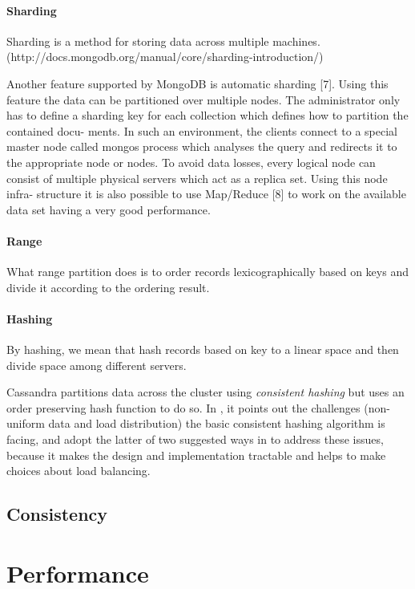 \documentclass[12pt,letter]{article}
\begin{document}
\paragraph*{Sharding}
Sharding is a method for storing data across multiple machines. (http://docs.mongodb.org/manual/core/sharding-introduction/)

Another feature supported by MongoDB is automatic sharding [7]. Using this feature the data can be partitioned over multiple nodes. The administrator only has to define a sharding key for each collection which defines how to partition the contained docu- ments. In such an environment, the clients connect to a special master node called mongos process which analyses the query and redirects it to the appropriate node or nodes. To avoid data losses, every logical node can consist of multiple physical servers which act as a replica set. Using this node infra- structure it is also possible to use Map/Reduce [8] to work on the available data set having a very good performance.

\paragraph*{Range}
What range partition does is to order records lexicographically based on keys and divide it according to the ordering result.

\paragraph*{Hashing}
By hashing, we mean that hash records based on key to a linear space and then divide space among different servers.

Cassandra partitions data across the cluster using \textit{consistent hashing} but uses an order preserving hash function to do so. In \citep{LakshamAvinash2010}, it points out the challenges (non-uniform data and load distribution) the basic consistent hashing algorithm\citep{Karger1997} is facing, and adopt the latter of two suggested ways in \citep{Stoica2003} to address these issues, because it makes the design and implementation tractable and helps to make choices about load balancing.



\subsection{Consistency}

\section{Performance}
\end{document}
